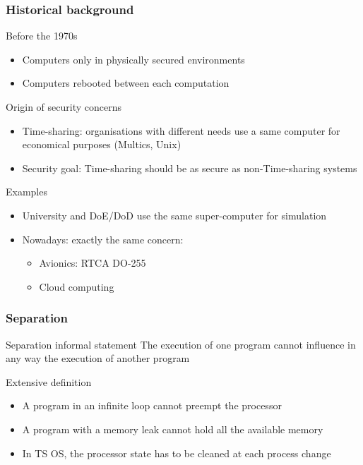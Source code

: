 \begin{reveals}
\begin{frame}
  \frametitle{Historical background}

  \begin{block}{Before the  1970s}
    \begin{itemize}
    \item Computers only in physically secured environments
    \item Computers rebooted between each computation
    \end{itemize}
  \end{block}

  \pause
  
  \begin{block}{Origin of security concerns}
    \begin{itemize}
    \item Time-sharing: organisations with different needs use a same
      computer for economical purposes (Multics, Unix)
    \item Security goal: Time-sharing should be as secure as non-Time-sharing systems
    \end{itemize}
  \end{block}

  \pause

  \begin{block}{Examples}
    \begin{itemize}
    \item University and DoE/DoD use the same super-computer for simulation
    \item Nowadays: exactly the same concern:
      \begin{itemize}
      \item Avionics: RTCA DO-255
      \item Cloud computing
      \end{itemize}
    \end{itemize}
  \end{block}

\end{frame}

\begin{frame}
  \frametitle{Separation}

  \begin{block}{Separation informal statement}
    The execution of one program cannot influence in any way the
    execution of another program
  \end{block}

  \pause

  \begin{block}{Extensive definition}
    \begin{itemize}[<+->]
    \item A program in an infinite loop cannot preempt the processor
    \item A program with a memory leak cannot hold all the available memory
    \item In TS OS, the processor state has to be cleaned at each
      process change
    \end{itemize}
  \end{block}
\end{frame}


\end{reveals}
